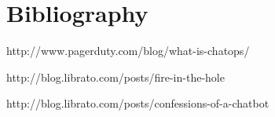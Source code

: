 \documentclass[
paper=128mm:96mm, %
fontsize=11pt, %
pagesize, %
parskip=half-, %
]{scrartcl} %
\newcommand*{\mygreen}[1]{\textcolor{mygreen}{#1}}
\theoremstyle{mythmstyle} %
\newtheorem{theorem}{Theorem}[section] %
\newtheorem{remark}[theorem]{Remark} %
\newtheorem{algorithm}[theorem]{Algorithm} %
\newcommand*{\mybox}[2]{ %
\par\noindent
\begin{tikzpicture}[mynodestyle/.style={rectangle,draw=mygreen,thick,inner sep=2mm,text justified,top color=white,bottom color=white,above}]\node[mynodestyle,at={(0.5*#1+2mm+0.4pt,0)}]{ %
\begin{minipage}[t]{#1}
#2
\end{minipage}
};
\end{tikzpicture}
\par\vspace{-1.3em}}
\begin{document}
\clearpage















\thispagestyle{empty} %

\section{Bibliography}


http://www.pagerduty.com/blog/what-is-chatops/

http://blog.librato.com/posts/fire-in-the-hole

http://blog.librato.com/posts/confessions-of-a-chatbot
\end{document}
